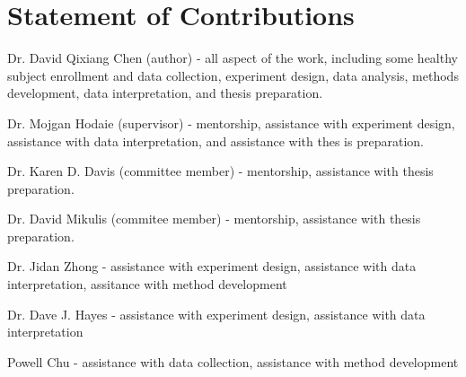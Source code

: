\chapter*{Statement of Contributions}

{\parskip=12pt
\noindent
Dr. David Qixiang Chen (author) - all aspect of the work, including some healthy subject enrollment and data collection, experiment design, data analysis, methods development, data interpretation, and thesis preparation.

\noindent
Dr. Mojgan Hodaie (supervisor) - mentorship, assistance with experiment design, assistance with data interpretation, and assistance with thes
is preparation. 

\noindent
Dr. Karen D. Davis (committee member) - mentorship, assistance with thesis preparation.

\noindent
Dr. David Mikulis (commitee member) - mentorship, assistance with thesis preparation.

\noindent
Dr. Jidan Zhong - assistance with experiment design, assistance with data interpretation, assitance with method development

\noindent
Dr. Dave J. Hayes - assistance with experiment design, assistance with data interpretation

\noindent
Powell Chu - assistance with data collection, assistance with method development
}